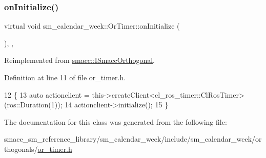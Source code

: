 \subsubsection{\texorpdfstring{on\+Initialize()}{onInitialize()}}
{\footnotesize\ttfamily virtual void sm\+\_\+calendar\+\_\+week\+::\+Or\+Timer\+::on\+Initialize (\begin{DoxyParamCaption}{ }\end{DoxyParamCaption})\hspace{0.3cm}{\ttfamily [inline]}, {\ttfamily [override]}, {\ttfamily [virtual]}}



Reimplemented from \hyperlink{classsmacc_1_1ISmaccOrthogonal_a6bb31c620cb64dd7b8417f8705c79c7a}{smacc\+::\+I\+Smacc\+Orthogonal}.



Definition at line 11 of file or\+\_\+timer.\+h.


\begin{DoxyCode}
12     \{
13         \textcolor{keyword}{auto} actionclient = this->createClient<cl\_ros\_timer::ClRosTimer>(ros::Duration(1));
14         actionclient->initialize();
15     \}
\end{DoxyCode}


The documentation for this class was generated from the following file\+:\begin{DoxyCompactItemize}
\item 
smacc\+\_\+sm\+\_\+reference\+\_\+library/sm\+\_\+calendar\+\_\+week/include/sm\+\_\+calendar\+\_\+week/orthogonals/\hyperlink{smacc__sm__reference__library_2sm__calendar__week_2include_2sm__calendar__week_2orthogonals_2or__timer_8h}{or\+\_\+timer.\+h}\end{DoxyCompactItemize}
